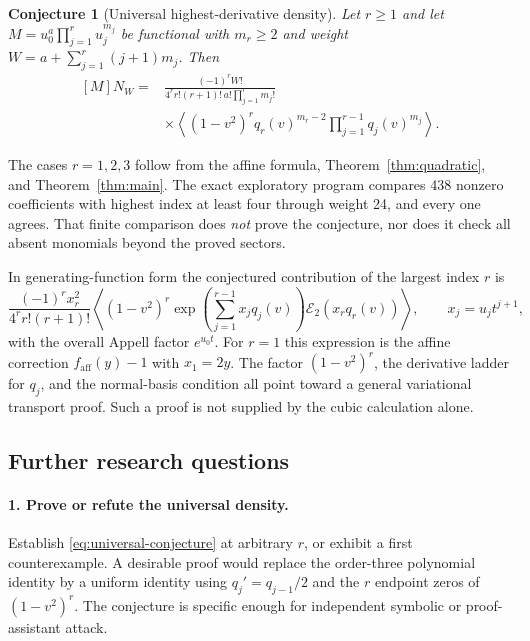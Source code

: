 \documentclass[11pt]{article}
\numberwithin{equation}{section}
\newtheorem{conjecture}[theorem]{Conjecture}
\theoremstyle{definition}\newtheorem{definition}[theorem]{Definition}
\theoremstyle{remark}\newtheorem{remark}[theorem]{Remark}
\newcommand{\avg}[1]{\left\langle #1\right\rangle}
\newcommand{\Erem}{\mathcal E_2}
\begin{document}
\begin{conjecture}[Universal highest-derivative density]
\label{conj:universal}
Let $r\ge1$ and let
$M=u_0^a\prod_{j=1}^ru_j^{m_j}$ be functional with $m_r\ge2$ and
weight $W=a+\sum_{j=1}^r(j+1)m_j$. Then
\begin{equation}\label{eq:universal-conjecture}
\begin{split}
 [M]N_W={}&\frac{(-1)^rW!}
 {4^r r!(r+1)!\,a!\prod_{j=1}^rm_j!}\\
 &\times\avg{(1-v^2)^r q_r(v)^{m_r-2}
                   \prod_{j=1}^{r-1}q_j(v)^{m_j}}.
\end{split}
\end{equation}
\end{conjecture}

The cases $r=1,2,3$ follow from the affine formula,
Theorem~\ref{thm:quadratic}, and Theorem~\ref{thm:main}. The exact
exploratory program compares 438 nonzero coefficients with highest index
at least four through weight 24, and every one agrees. That finite
comparison does \emph{not} prove the conjecture, nor does it check all
absent monomials beyond the proved sectors.

In generating-function form the conjectured contribution of the largest
index $r$ is
\begin{equation}\label{eq:universal-increment}
 \frac{(-1)^r x_r^2}{4^r r!(r+1)!}
 \avg{(1-v^2)^r
   \exp\left(\sum_{j=1}^{r-1}x_jq_j(v)\right)\Erem(x_rq_r(v))},
 \qquad x_j=u_jt^{j+1},
\end{equation}
with the overall Appell factor $e^{u_0t}$. For $r=1$ this expression is
the affine correction $f_{\mathrm{aff}}(y)-1$ with $x_1=2y$.
The factor $(1-v^2)^r$, the derivative ladder for $q_j$, and the
normal-basis condition all point toward a general variational transport
proof. Such a proof is not supplied by the cubic calculation alone.

\subsection{Further research questions}
\paragraph{1. Prove or refute the universal density.}
Establish \eqref{eq:universal-conjecture} at arbitrary $r$, or exhibit a
first counterexample. A desirable proof would replace the order-three
polynomial identity by a uniform identity using $q_j'=q_{j-1}/2$ and the
$r$ endpoint zeros of $(1-v^2)^r$. The conjecture is specific enough for
independent symbolic or proof-assistant attack.
\end{document}
